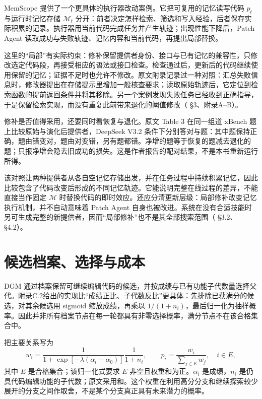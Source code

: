 MemScope 提供了一个更具体的执行器改动案例。它把可复用的记忆读写代码 $p_t$ 与运行时记忆存储 $\mathcal M_t$ 分开：前者决定怎样检索、筛选和写入经验，后者保存实际积累的记录。执行器用当前代码完成任务并产生轨迹；出现性能下降后，Patch Agent 读取成功与失败轨迹、记忆内容和当前代码，再提出局部替换\cite{memscope-2610}。

这里的“局部”有实际约束：修补保留提供者身份、接口与已有记忆的兼容性，只修改选定代码段，再接受相应的语法或接口检查。检查通过后，更新后的代码继续使用保留的记忆；证据不足时也允许不修改。原文附录记录过一种对照：汇总失败信息时，修改器提出在存储提示里增加一般核查要求；读取原始轨迹后，它定位到检索函数的提前返回条件并将其移除。另一个案例发现失败任务已经收到正确指导，于是保留检索实现，而没有重复此前带来退化的阈值修改（\cite{memscope-2610} §3、附录A--B）。

修补是否值得采用，还要同时看恢复与退化。原文 Table 3 在同一组道 xBench 题上比较原始与演化后提供者，DeepSeek V3.2 条件下分别答对与题：其中题保持正确，题由错变对，题由对变错，另有题都错\cite{memscope-2610}。净增的题等于恢复的题减去退化的题；只报净增会隐去旧成功的损失。这是作者报告的配对结果，不是本书重新运行所得。

该对照让两种提供者从各自空记忆存储出发，并在任务过程中持续积累记忆，因此比较包含了代码改变后形成的不同记忆轨迹。它能说明完整在线过程的差异，不能直接当作固定 $\mathcal M$ 时替换代码的即时效应。还应分清更新层级：局部修补改变记忆执行机制，并不自动意味着 Patch Agent 自身也被改进。系统在没有合适技能时另可生成完整的新提供者，因而“局部修补”也不是其全部搜索范围（\cite{memscope-2610} §3.2、§4.2）。

\section{候选档案、选择与成本}
\label{sec:ch12-archiveweights}

DGM 通过档案保留可继续编辑代码的候选，并按成绩与已有功能子代数量选择父代。附录C.2给出的实现比“成绩正比、子代数反比”更具体：先排除已获满分的候选，对其余候选用 sigmoid 缩放成绩，再乘以 $1/(1+n_i)$，最后归一化为抽样概率\cite{dgm-2505}。因此并非所有档案节点在每一轮都具有非零选择概率，满分节点不在该合格集合中。

把主要关系写为
\begin{equation}
 w_i=\frac{1}{1+\exp[-\lambda(\alpha_i-\alpha_0)]}\frac{1}{1+n_i},
 \qquad p_i=\frac{w_i}{\sum_{j\in E}w_j},\quad i\in E,
 \label{eq:ch12-parentweight}
\end{equation}
其中 $E$ 是合格集合；该归一化式要求 $E$ 非空且权重和为正。$\alpha_i$ 是成绩，$n_i$ 是仍具代码编辑功能的子代数；原文采用和\cite{dgm-2505}。这个权重在利用高分分支和继续探索较少展开的分支之间作取舍，不是某个分支真正具有未来潜力的概率。

